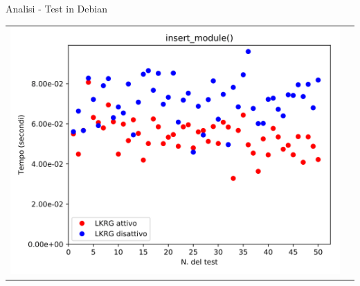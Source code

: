 \documentclass[12pt]{beamer}
\begin{document}
\begin{frame}[fragile]{Analisi - Test in Debian}
\begin{tabular}{ c c }
    	\includegraphics[scale=0.11]{res/Debian/Insert}\\
    \end{tabular}
  \end{frame}
\end{document}
